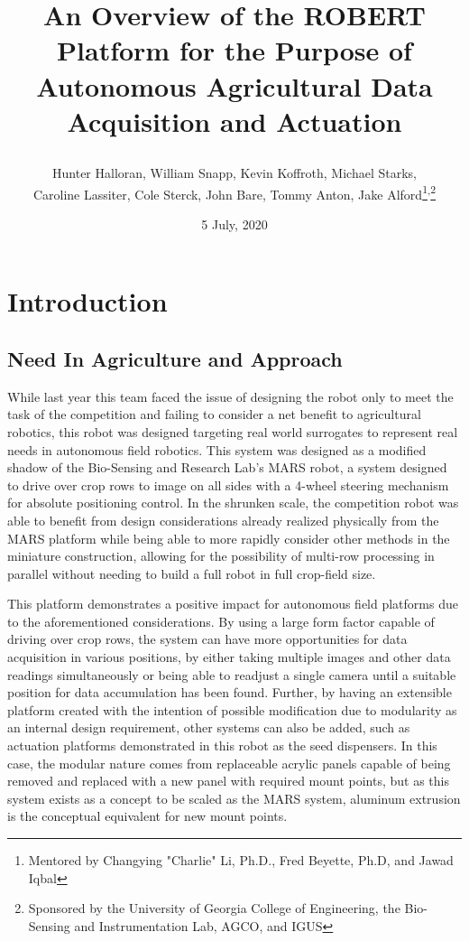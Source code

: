 \documentclass[11pt, twoside]{report}
\title{An Overview of the ROBERT Platform for the Purpose of Autonomous Agricultural Data Acquisition and Actuation
\author{Hunter Halloran, William Snapp, Kevin Koffroth, Michael Starks, \\Caroline Lassiter, Cole Sterck, John Bare, Tommy Anton, Jake Alford\thanks {Mentored by Changying "Charlie" Li, Ph.D., Fred Beyette, Ph.D, and Jawad Iqbal}\textsuperscript{,}\thanks{Sponsored by the University of Georgia College of Engineering, the Bio-Sensing and Instrumentation Lab, AGCO, and IGUS}} }
\date{5 July, 2020}
\begin{document}
\begin{titlepage}
\maketitle
\end{titlepage}

\newpage
\setcounter{tocdepth}{3}
\raggedbottom
\tableofcontents
\newpage

\section{Introduction}
\subsection{Need In Agriculture and Approach}
While last year this team faced the issue of designing the robot only to meet the task of the competition and failing to consider a net benefit to agricultural robotics, this robot was designed targeting real world surrogates to represent real needs in autonomous field robotics. This system was designed as a modified shadow of the Bio-Sensing and Research Lab’s MARS robot, a system designed to drive over crop rows to image on all sides with a 4-wheel steering mechanism for absolute positioning control. In the shrunken scale, the competition robot was able to benefit from design considerations already realized physically from the MARS platform while being able to more rapidly consider other methods in the miniature construction, allowing for the possibility of multi-row processing in parallel without needing to build a full robot in full crop-field size. 

This platform demonstrates a positive impact for autonomous field platforms due to the aforementioned considerations. By using a large form factor capable of driving over crop rows, the system can have more opportunities for data acquisition in various positions, by either taking multiple images and other data readings simultaneously or being able to readjust a single camera until a suitable position for data accumulation has been found. Further, by having an extensible platform created with the intention of possible modification due to modularity as an internal design requirement, other systems can also be added, such as actuation platforms demonstrated in this robot as the seed dispensers. In this case, the modular nature comes from replaceable acrylic panels capable of being removed and replaced with a new panel with required mount points, but as this system exists as a concept to be scaled as the MARS system, aluminum extrusion is the conceptual equivalent for new mount points.
\end{document}
